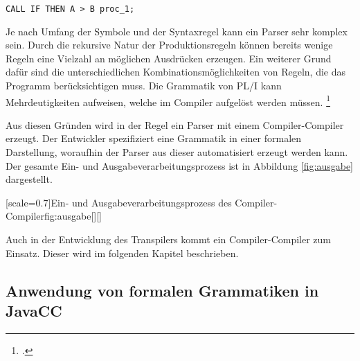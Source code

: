 \begin{lstlisting}[language=PL/I, caption=Ungültiges PL/I, label={lst:pliwrongstatement}]
	CALL IF THEN A > B proc_1;
\end{lstlisting}

Je nach Umfang der Symbole und der Syntaxregel kann ein Parser sehr komplex sein. 
Durch die rekursive Natur der Produktionsregeln können bereits wenige Regeln eine Vielzahl an möglichen Ausdrücken erzeugen.
Ein weiterer Grund dafür sind die unterschiedlichen Kombinationsmöglichkeiten von Regeln, die das Programm berücksichtigen muss. Die Grammatik von PL/I kann Mehrdeutigkeiten aufweisen, welche im Compiler aufgelöst werden müssen. \footcite[Vgl. ][S. 262ff. ]{compibau}

Aus diesen Gründen wird in der Regel ein Parser mit einem Compiler-Compiler erzeugt.
Der Entwickler spezifiziert eine Grammatik in einer formalen Darstellung, woraufhin der Parser aus dieser automatisiert erzeugt werden kann. Der gesamte Ein- und Ausgabeverarbeitungsprozess ist in Abbildung \ref{fig:ausgabe} dargestellt.


[scale=0.7]{Ein- und Ausgabeverarbeitungsprozess des Compiler-Compiler}{fig:ausgabe}[][]
\pagebreak

Auch in der Entwicklung des Transpilers kommt ein Compiler-Compiler zum Einsatz. Dieser wird im folgenden Kapitel beschrieben.




     
\pagebreak
\subsection{Anwendung von formalen Grammatiken in JavaCC}

